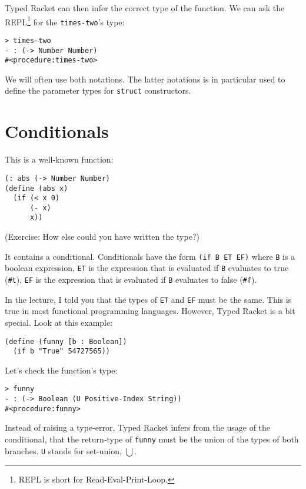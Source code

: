 \documentclass{article}
\begin{document}
Typed Racket can then infer the correct type of the function. We can ask the REPL\footnote{REPL is short for Read-Eval-Print-Loop.} for the \lstinline{times-two}'s type:

\begin{lstlisting}
> times-two
- : (-> Number Number)
#<procedure:times-two>
\end{lstlisting}

We will often use both notations. The latter notations is in particular used to define the parameter types for \lstinline{struct} constructors.

\section{Conditionals}

This is a well-known function:

\begin{lstlisting}
(: abs (-> Number Number)
(define (abs x)
  (if (< x 0)
      (- x)
      x))
\end{lstlisting}

(Exercise: How else could you have written the type?)

It contains a conditional. Conditionals have the form \lstinline{(if B ET EF)} where \lstinline{B} is a boolean expression, \lstinline{ET} is the expression that is evaluated if \lstinline{B} evaluates to true (\lstinline{#t}), \lstinline{EF} is the expression that is evaluated if \lstinline{B} evaluates to false (\lstinline{#f}).

In the lecture, I told you that the types of \lstinline{ET} and \lstinline{EF} must be the same. This is true in most functional programming languages. However, Typed Racket is a bit special. Look at this example:

\begin{lstlisting}
(define (funny [b : Boolean])
  (if b "True" 54727565))
\end{lstlisting}

Let's check the function's type:

\begin{lstlisting}
> funny
- : (-> Boolean (U Positive-Index String))
#<procedure:funny>
\end{lstlisting}

Instead of raising a type-error, Typed Racket infers from the usage of the conditional, that the return-type of \lstinline{funny} must be the union of the types of both branches. \lstinline{U} stands for set-union, $\bigcup$.
\end{document}
